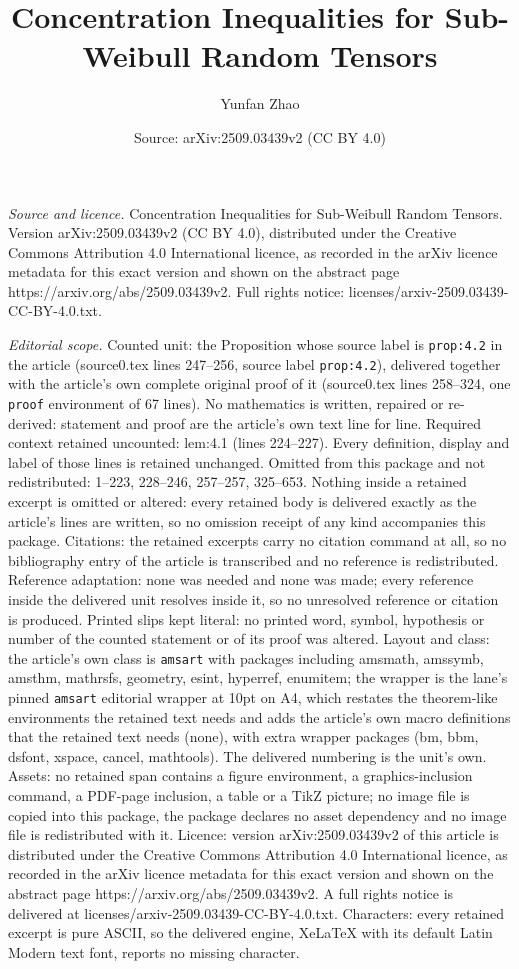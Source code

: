 \documentclass[10pt,a4paper]{amsart}
\title[Concentration Inequalities for Sub-Weibull Random Tensors]{Concentration Inequalities for Sub-Weibull Random Tensors}
\author{Yunfan Zhao}
\date{Source: arXiv:2509.03439v2 (CC BY 4.0)}
\begin{document}
\maketitle

\noindent\emph{Source and licence.} Concentration Inequalities for Sub-Weibull Random Tensors. Version arXiv:2509.03439v2 (CC BY 4.0), distributed under the Creative Commons Attribution 4.0 International licence, as recorded in the arXiv licence metadata for this exact version and shown on the abstract page https://arxiv.org/abs/2509.03439v2. Full rights notice: licenses/arxiv-2509.03439-CC-BY-4.0.txt.\par\smallskip

\noindent\textit{Editorial scope.} Counted unit: the Proposition whose source label is \texttt{prop:4.2} in the article (source0.tex lines 247--256, source label \texttt{prop:4.2}), delivered together with the article's own complete original proof of it (source0.tex lines 258--324, one \texttt{proof} environment of 67 lines). No mathematics is written, repaired or re-derived: statement and proof are the article's own text line for line. Required context retained uncounted: lem:4.1 (lines 224--227). Every definition, display and label of those lines is retained unchanged. Omitted from this package and not redistributed: 1--223, 228--246, 257--257, 325--653. Nothing inside a retained excerpt is omitted or altered: every retained body is delivered exactly as the article's lines are written, so no omission receipt of any kind accompanies this package. Citations: the retained excerpts carry no citation command at all, so no bibliography entry of the article is transcribed and no reference is redistributed. Reference adaptation: none was needed and none was made; every reference inside the delivered unit resolves inside it, so no unresolved reference or citation is produced. Printed slips kept literal: no printed word, symbol, hypothesis or number of the counted statement or of its proof was altered. Layout and class: the article's own class is \texttt{amsart} with packages including amsmath, amssymb, amsthm, mathrsfs, geometry, esint, hyperref, enumitem; the wrapper is the lane's pinned \texttt{amsart} editorial wrapper at 10pt on A4, which restates the theorem-like environments the retained text needs and adds the article's own macro definitions that the retained text needs (none), with extra wrapper packages (bm, bbm, dsfont, xspace, cancel, mathtools). The delivered numbering is the unit's own. Assets: no retained span contains a figure environment, a graphics-inclusion command, a PDF-page inclusion, a table or a TikZ picture; no image file is copied into this package, the package declares no asset dependency and no image file is redistributed with it. Licence: version arXiv:2509.03439v2 of this article is distributed under the Creative Commons Attribution 4.0 International licence, as recorded in the arXiv licence metadata for this exact version and shown on the abstract page https://arxiv.org/abs/2509.03439v2. A full rights notice is delivered at licenses/arxiv-2509.03439-CC-BY-4.0.txt. Characters: every retained excerpt is pure ASCII, so the delivered engine, XeLaTeX with its default Latin Modern text font, reports no missing character.
\end{document}
